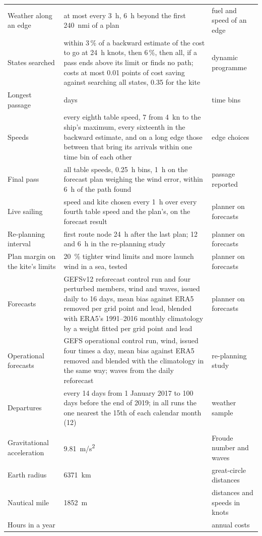 {\begin{longtable}{@{}>{\raggedright\arraybackslash}p{4.2cm}>{\raggedright\arraybackslash}p{4.8cm}>{\raggedright\arraybackslash}p{6.6cm}@{}}
Weather along an edge & at most every \SI{3}{h}, \SI{6}{h} beyond the first \SI{240}{nmi} of a plan & fuel and speed of an edge \\
States searched & within 3\,\% of a backward estimate of the cost to go at \SI{24}{h} knots, then 6\,\%, then all, if a pass ends above its limit or finds no path; costs at most 0.01 points of cost saving against searching all states, 0.35 for the kite & dynamic programme \\
Longest passage & 50 days & time bins \\
Speeds & every eighth table speed, 7 from \SI{4}{kn} to the ship's maximum, every sixteenth in the backward estimate, and on a long edge those between that bring its arrivals within one time bin of each other & edge choices \\
Final pass & all table speeds, \SI{0.25}{h} bins, \SI{1}{h} on the forecast plan weighing the wind error, within \SI{6}{h} of the path found & passage reported \\
Live sailing & speed and kite chosen every \SI{1}{h} over every fourth table speed and the plan's, on the forecast result & planner on forecasts \\
Re-planning interval & first route node \SI{24}{h} after the last plan; 12 and \SI{6}{h} in the re-planning study & planner on forecasts \\
Plan margin on the kite's limits & \SI{20}{\%} tighter wind limits and more launch wind in a sea, tested & planner on forecasts \\
Forecasts & GEFSv12 reforecast control run and four perturbed members, wind and waves, issued daily to 16 days, mean bias against ERA5 removed per grid point and lead, blended with ERA5's 1991--2016 monthly climatology by a weight fitted per grid point and lead & planner on forecasts \\
Operational forecasts & GEFS operational control run, wind, issued four times a day, mean bias against ERA5 removed and blended with the climatology in the same way; waves from the daily reforecast & re-planning study \\
Departures & every 14 days from 1 January 2017 to 100 days before the end of 2019; in all runs the one nearest the 15th of each calendar month (12) & weather sample \\
\multicolumn{3}{@{}l}{\textit{Constants}}\\
Gravitational acceleration & \SI{9.81}{m/s^2} & Froude number and waves \\
Earth radius & \SI{6371}{km} & great-circle distances \\
Nautical mile & \SI{1852}{m} & distances and speeds in knots \\
Hours in a year & 8760 & annual costs \\
\end{longtable}}

